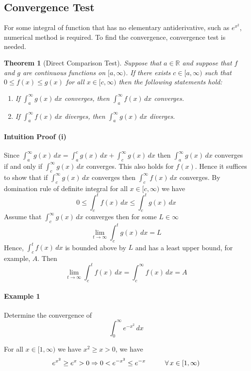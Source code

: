 \documentclass[12pt]{article}
\newcommand\tab[1][1cm]{\hspace*{#1}}
\newtheorem{theorem}{Theorem}
\begin{document}
\subsection{Convergence Test}
For some integral of function that has no elementary antiderivative, such as $e^{x^2}$, numerical method is required. To
find the convergence, convergence test is needed.

\begin{theorem}[Direct Comparison Test]
    Suppose that $a \in \mathbb{R}$ and suppose that $f$ and $g$ are continuous functions on $[a, \infty)$. If there exists $c \in [a, \infty)$ such
    that $0 \leq f(x) \leq g(x)$ for all $x \in [c, \infty)$ then the following statements hold:
    \begin{enumerate}[i]
        \item If $\int_a^{\infty} g(x) \, dx$ converges, then $\int_a^{\infty} f(x) \, dx$ converges.
        \item If $\int_a^{\infty} f(x) \, dx$ diverges, then $\int_a^{\infty} g(x) \, dx$ diverges.
    \end{enumerate}
\end{theorem}

\paragraph{Intuition Proof (i)}
Since $\int_a^{\infty} g(x) \, dx = \int_a^c g(x) \, dx + \int_c^{\infty} g(x) \, dx$ then $\int_a^{\infty} g(x) \, dx$ converges if and only if $\int_c^{\infty} g(x) \, dx$ converges.
This also holds for $f(x)$. Hence it suffices to show that if $\int_c^{\infty} g(x) \, dx$ converges then $\int_c^{\infty} f(x) \, dx$ converges.
By domination rule of definite integral for all $x \in [c, \infty)$ we have
\[
    0 \leq \int_c^t f(x) \, dx \leq \int_c^t g(x) \, dx
\]
Assume that $\int_c^{\infty} g(x) \, dx$ converges then for some $L \in \infty$ 
\[
    \lim_{t \to \infty} \int_c^t g(x) \, dx = L
\]
Hence, $\int_c^t f(x) \, dx$ is bounded above by $L$ and has a least upper bound, for example, $A$.
Then 
\[
    \lim_{t \to \infty} \int_c^t f(x) \, dx = \int_c^{\infty} f(x) \, dx = A
\]

\paragraph{Example 1} Determine the convergence of 
\[
    \int_0^{\infty} e^{ - x^2} \, dx
\]

For all $x \in [1, \infty)$ we have $x^2 \geq x > 0$, we have
\[
    e^{x^2} \geq e^{x} > 0 \Rightarrow 0 < e^{ - x^2} \leq e^{ - x} \textrm{\tab} \forall \, x \in [1, \infty)
\]
\end{document}
